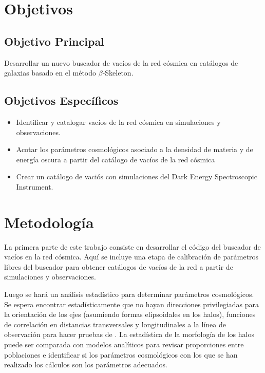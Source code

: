 \documentclass[preprint]{aastex62}
\begin{document}
  \section{Objetivos}

  \subsection{Objetivo Principal}
  Desarrollar un nuevo buscador de vacíos de la red cósmica en catálogos de galaxias
  basado en el método $\beta$-Skeleton.
  
  \subsection{Objetivos Específicos}

  \begin{itemize}    
      \item Identificar y catalogar vacíos de la red cósmica en
        simulaciones y observaciones.
      \item Acotar los parámetros cosmológicos asociado a la densidad
        de materia y de energía oscura a partir del catálogo de
        vacíos de la red cósmica
    \item  Crear un cat\'alogo de vaci\'os con simulaciones del Dark
      Energy Spectroscopic Instrument.
  \end{itemize}
  
  \section{Metodología}

  La primera parte de este trabajo consiste en desarrollar el código del buscador de vacíos
  en la red cósmica. Aquí se incluye una etapa de calibración de parámetros libres del buscador
  para obtener catálogos de vacíos de la red a partir de simulaciones y observaciones.
   
  Luego se hará un análisis estadístico para determinar parámetros cosmológicos.
  Se espera encontrar estadísticamente que no hayan direcciones privilegiadas para la orientación
  de los ejes (asumiendo formas elipsoidales en los halos), funciones de correlación en distancias
  transversales y longitudinales a la línea de observación para hacer pruebas de
  \citet{AlcockPaczynski1979}. La estadística de la morfología de los halos puede ser comparada
  con modelos analíticos para revisar proporciones entre poblaciones e identificar si los
  parámetros cosmológicos con los que se han realizado los cálculos son los parámetros adecuados.
  
\end{document}
